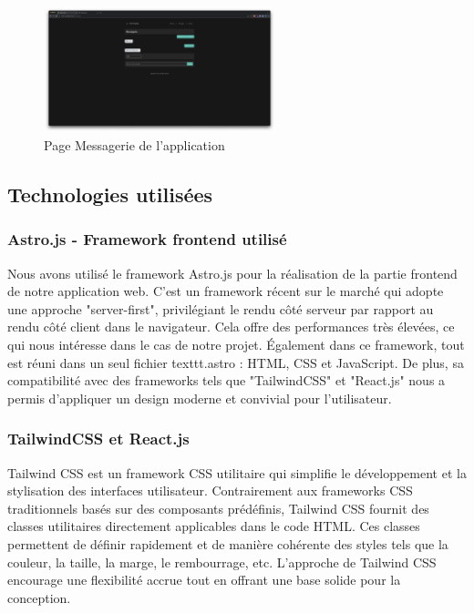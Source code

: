 \documentclass[12pt, a4paper, oneside]{article}
\begin{document}
\begin{figure}[h]
    \centering
    \includegraphics[width=0.6\textwidth]{images/PageMessagerieApplication.png}
    \caption{Page Messagerie de l'application}
\end{figure}

\subsection{Technologies utilisées}
\subsubsection{Astro.js - Framework frontend utilisé}
Nous avons utilisé le framework Astro.js pour la réalisation de la partie frontend de notre application web. 
C'est un framework récent sur le marché qui adopte une approche "server-first", privilégiant le rendu côté serveur par rapport au rendu côté client dans le navigateur. 
Cela offre des performances très élevées, ce qui nous intéresse dans le cas de notre projet.
Également dans ce framework, tout est réuni dans un seul fichier texttt{.astro} : HTML, CSS et JavaScript. 
De plus, sa compatibilité avec des frameworks tels que "TailwindCSS" et "React.js" nous a permis d'appliquer un design moderne et convivial pour l'utilisateur.


\subsubsection{TailwindCSS et React.js}
Tailwind CSS est un framework CSS utilitaire qui simplifie le développement et la stylisation des interfaces utilisateur. Contrairement aux frameworks CSS traditionnels basés sur des composants prédéfinis, Tailwind CSS fournit des classes utilitaires directement applicables dans le code HTML. Ces classes permettent de définir rapidement et de manière cohérente des styles tels que la couleur, la taille, la marge, le rembourrage, etc. L'approche de Tailwind CSS encourage une flexibilité accrue tout en offrant une base solide pour la conception.
\end{document}
